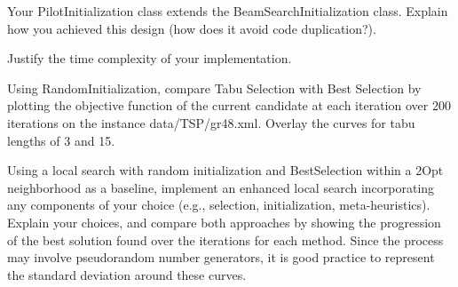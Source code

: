 \documentclass[12pt]{report}
\newcommand{\answerbox}[2]{\hfill\break\\
        \framebox[\linewidth]{\parbox[c][#1][c]{\dimexpr\linewidth-2\fboxsep-2\fboxrule}{#2}}
}
\begin{document}
\newpage


\begin{Exercise}[title={Initialization}]


\Question Your PilotInitialization class extends the BeamSearchInitialization class. Explain how you achieved this design (how does it avoid code duplication?).
\answerbox{10cm}{
}

\Question Justify the time complexity of your implementation.
\answerbox{10cm}{
}

\end{Exercise}

\newpage

\begin{Exercise}[title={Improving the solution}]

\Question Using RandomInitialization, compare Tabu Selection with Best Selection by plotting the objective function of the current candidate at each iteration over 200 iterations on the instance data/TSP/gr48.xml. Overlay the curves for tabu lengths of 3 and 15.
\answerbox{6cm}{
}

\Question Using a local search with random initialization and BestSelection within a 2Opt neighborhood as a baseline, implement an enhanced local search incorporating any components of your choice (e.g., selection, initialization, meta-heuristics). Explain your choices, and compare both approaches by showing the progression of the best solution found over the iterations for each method. Since the process may involve pseudorandom number generators, it is good practice to represent the standard deviation around these curves.

\answerbox{10cm}{
}

\end{Exercise}
\end{document}
